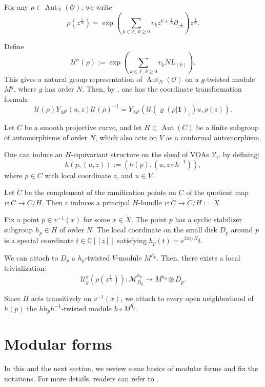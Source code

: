 \documentclass[9pt]{amsart}
\begin{document}
For any $\rho \in \operatorname{Aut}_{N}(\mathcal{O})$, we write
\[
\rho(z^{\frac{1}{N}}) = \exp\left( \sum_{k \in \mathbb{Z},\, k \geq 0} v_k z^{k + \frac{1}{N}} \partial_{z^{\frac{1}{N}}} \right) z^{\frac{1}{N}}.
\]

Define
\[
\mathcal{U}^{\sigma}(\rho) := \exp\left( \sum_{k \in \mathbb{Z},\, k \geq 0} v_k N L_{(k)} \right).
\]
This gives a natural group representation of $\operatorname{Aut}_{N}(\mathcal{O})$ on a $g$-twisted module $M^{g}$, where $g$ has order $N$. Then, by \cite{frenkel2004twisted}, one has the coordinate transformation formula
\[
\mathcal{U}(\rho) Y_{M^{g}}(u, z) \mathcal{U}(\rho)^{-1} = Y_{M^{g}}\left( \mathcal{U}\left( \varrho(\rho|\mathbf{1})_{z} \right) u, \rho(z) \right).
\]

Let $C$ be a smooth projective curve, and let $H \subset \operatorname{Aut}(C)$ be a finite subgroup of automorphisms of order $N$, which also acts on $V$ as a conformal automorphism.

One can induce an $H$-equivariant structure on the sheaf of VOAs $\mathcal{V}_{C}$ by defining:
\[
h(p, (u, z)) := (h(p), (u, z \circ h^{-1})),
\]
where $p \in C$ with local coordinate $z$, and $u \in V$.

Let $\mathring{C}$ be the complement of the ramification points on $C$ of the quotient map $v: C \to C/H$. Then $v$ induces a principal $H$-bundle $v: \mathring{C} \to \mathring{C}/H := \mathring{X}$.

Fix a point $p \in v^{-1}(x)$ for some $x \in \mathring{X}$. The point $p$ has a cyclic stabilizer subgroup $h_p \in H$ of order $N$. The local coordinate on the small disk $D_p$ around $p$ is a special coordinate $t \in \mathbb{C}[[z]]$ satisfying $h_p(t) = e^{2\pi i/N} t$.

We can attach to $D_p$ a $h_p$-twisted $V$-module $M^{h_p}$. Then, there exists a local trivialization:
\[
\mathcal{U}^{\sigma}_{\varrho}(\rho(z^{\frac{1}{N}})): \mathcal{M}^{h_p}_{D_p} \to M^{h_p} \otimes D_p.
\]

Since $H$ acts transitively on $v^{-1}(x)$, we attach to every open neighborhood of $h(p)$ the $h h_p h^{-1}$-twisted module $h \circ M^{h_p}$.

\section{Modular forms}
In this and the next section, we review some basics of modular forms and fix the notations. For more details, readers can refer to   \cite{zhu1996modular, mason2010vertex, zagier2008elliptic}.
\end{document}
